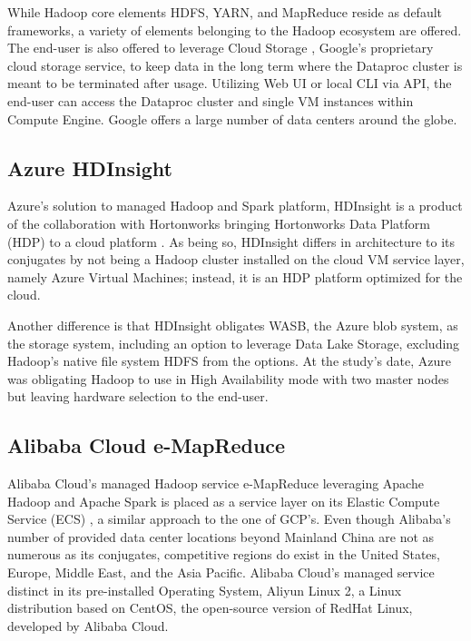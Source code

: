 \documentclass[review]{elsarticle}
\begin{document}
While Hadoop core elements HDFS, YARN, and MapReduce reside as default frameworks, a variety of elements belonging to the Hadoop ecosystem are offered. The end-user is also offered to leverage Cloud Storage \cite{noauthor_cloud_nodate}, Google's proprietary cloud storage service, to keep data in the long term where the Dataproc cluster is meant to be terminated after usage. Utilizing Web UI or local CLI via API, the end-user can access the Dataproc cluster and single VM instances within Compute Engine. Google offers a large number of data centers around the globe.

\subsection{Azure HDInsight}\label{Azure_HDInsight}
Azure's solution to managed Hadoop and Spark platform, HDInsight \cite{noauthor_azure_nodate} is a product of the collaboration with Hortonworks bringing Hortonworks Data Platform (HDP) to a cloud platform \cite{noauthor_azuravail_nodate}. As being so, HDInsight differs in architecture to its conjugates by not being a Hadoop cluster installed on the cloud VM service layer, namely Azure Virtual Machines; instead, it is an HDP platform optimized for the cloud. 

Another difference is that HDInsight obligates WASB, the Azure blob system, as the storage system, including an option to leverage Data Lake Storage, excluding Hadoop's native file system HDFS from the options. At the study's date, Azure was obligating Hadoop to use in High Availability mode with two master nodes but leaving hardware selection to the end-user.

\subsection{Alibaba Cloud e-MapReduce}\label{Alibaba_eMapReduce}
Alibaba Cloud's managed Hadoop service e-MapReduce \cite{noauthor_what_nodate} leveraging Apache Hadoop and Apache Spark is placed as a service layer on its Elastic Compute Service (ECS) \cite{noauthor_alielastic_nodate}, a similar approach to the one of GCP's. Even though Alibaba's number of provided data center locations beyond Mainland China are not as numerous as its conjugates, competitive regions do exist in the United States, Europe, Middle East, and the Asia Pacific. Alibaba Cloud's managed service distinct in its pre-installed Operating System, Aliyun Linux 2, a Linux distribution based on CentOS, the open-source version of RedHat Linux, developed by Alibaba Cloud. 
\end{document}
